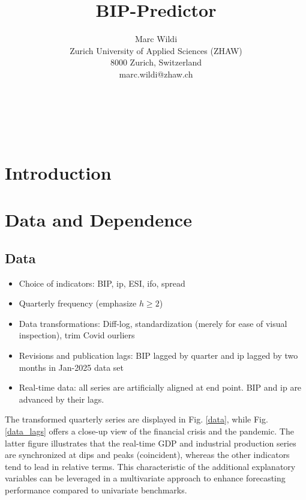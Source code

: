 \documentclass[a4paper]{article}
\title{BIP-Predictor}
\author{Marc Wildi\\
Zurich University of Applied Sciences (ZHAW)\\
8000 Zurich, Switzerland\\
marc.wildi@zhaw.ch}
\begin{document}
\maketitle

\begin{abstract}
\noindent 

\end{abstract}

~\\
~\\





\section{Introduction}



\section{Data and Dependence}




\subsection{Data}

\begin{itemize}
\item Choice of indicators: BIP, ip, ESI, ifo, spread
\item Quarterly frequency (emphasize $h\geq 2$)
\item Data transformations: Diff-log, standardization (merely for ease of visual inspection), trim Covid ourliers
\item Revisions and publication lags:  BIP lagged by quarter and ip lagged by two months in Jan-2025 data set
\item Real-time data: all series are artificially aligned at end point. BIP and ip are advanced by their lags.
\end{itemize}

The transformed quarterly series are displayed in Fig. \ref{data}, while Fig. \ref{data_lags} offers a close-up view of the financial crisis and the pandemic. The latter figure illustrates that the real-time GDP and industrial production series are synchronized at dips and peaks (coincident), whereas the other indicators tend to lead in relative terms. This characteristic of the additional explanatory variables can be leveraged in a multivariate approach to enhance forecasting performance compared to univariate benchmarks. 
\end{document}
